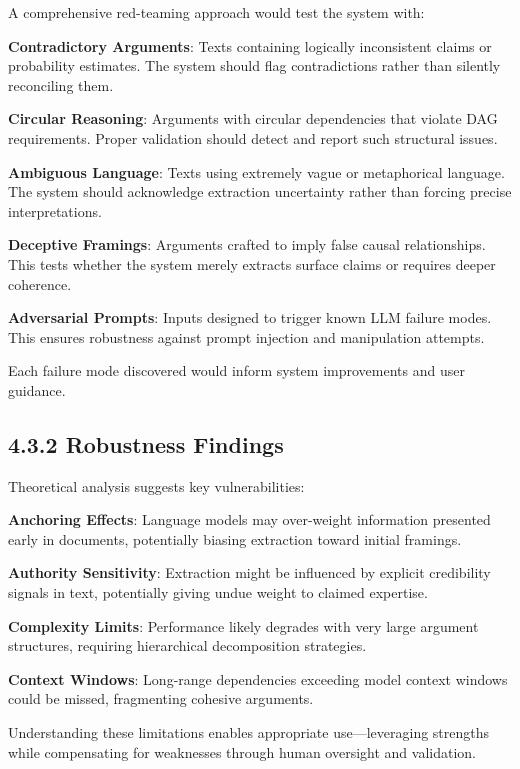 \documentclass[
  11pt,
  letterpaper,
  openany]{book}
\begin{document}
A comprehensive red-teaming approach would test the system with:

\textbf{Contradictory Arguments}: Texts containing logically
inconsistent claims or probability estimates. The system should flag
contradictions rather than silently reconciling them.

\textbf{Circular Reasoning}: Arguments with circular dependencies that
violate DAG requirements. Proper validation should detect and report
such structural issues.

\textbf{Ambiguous Language}: Texts using extremely vague or metaphorical
language. The system should acknowledge extraction uncertainty rather
than forcing precise interpretations.

\textbf{Deceptive Framings}: Arguments crafted to imply false causal
relationships. This tests whether the system merely extracts surface
claims or requires deeper coherence.

\textbf{Adversarial Prompts}: Inputs designed to trigger known LLM
failure modes. This ensures robustness against prompt injection and
manipulation attempts.

Each failure mode discovered would inform system improvements and user
guidance.

\subsection{4.3.2 Robustness Findings}\label{sec-robustness-findings}

Theoretical analysis suggests key vulnerabilities:

\textbf{Anchoring Effects}: Language models may over-weight information
presented early in documents, potentially biasing extraction toward
initial framings.

\textbf{Authority Sensitivity}: Extraction might be influenced by
explicit credibility signals in text, potentially giving undue weight to
claimed expertise.

\textbf{Complexity Limits}: Performance likely degrades with very large
argument structures, requiring hierarchical decomposition strategies.

\textbf{Context Windows}: Long-range dependencies exceeding model
context windows could be missed, fragmenting cohesive arguments.

Understanding these limitations enables appropriate use---leveraging
strengths while compensating for weaknesses through human oversight and
validation.
\end{document}
